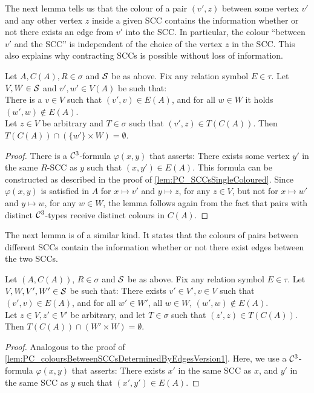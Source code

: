\documentclass[a4paper,UKenglish,cleveref, autoref, thm-restate]{lipics-v2021}
\renewcommand{\phi}{\varphi}
\renewcommand{\phi}{\varphi}
\newcommand{\Cc}{{\cal C}}
\newcommand{\Ss}{{\cal S}}
\begin{document}
	The next lemma tells us that the colour of a pair $(v',z)$ between some vertex $v'$ and any other vertex $z$ inside a given SCC contains the information whether or not there exists an edge from $v'$ into the SCC. In particular, the colour ``between $v'$ and the SCC'' is independent of the choice of the vertex $z$ in the SCC.
	This also explains why contracting SCCs is possible without loss of information.
	
	\begin{lemma}
		\label{lem:PC_coloursBetweenSCCsDeterminedByEdgesVersion1}
		Let $A,C(A), R \in \sigma$ and $\Ss$ be as above. Fix any relation symbol $E \in \tau$. Let $V,W \in \Ss$ and $v',w' \in V(A)$ be such that:\\
		There is a $v \in V$ such that $(v',v) \in E(A)$, and for all $w \in W$ it holds $(w',w) \notin E(A)$. \\
		Let $z \in V$ be arbitrary and $T \in \sigma$ such that $(v',z) \in T(C(A))$. Then $T(C(A)) \cap (\{w'\} \times W) = \emptyset$.
	\end{lemma}
	\begin{proof}
		There is a $\Cc^3$-formula $\phi(x,y)$ that asserts: There exists some vertex $y'$ in the same $R$-SCC as $y$ such that $(x,y') \in E(A)$. This formula can be constructed as described in the proof of \autoref{lem:PC_SCCsSingleColoured}. Since $\phi(x,y)$ is satisfied in $A$ for $x \mapsto v'$ and $y \mapsto z$, for any $z \in V$, but not for $x \mapsto w'$ and $y \mapsto w$, for any $w \in W$, the lemma follows again from the fact that pairs with distinct $\Cc^3$-types receive distinct colours in $C(A)$.
	\end{proof}
	
	
	
	
	The next lemma is of a similar kind. It states that the colours of pairs between different SCCs contain the information whether or not there exist edges between the two SCCs.
	
	
	\begin{lemma}
		\label{lem:PC_coloursBetweenSCCsDeterminedByEdges}
		Let $(A,C(A))$, $R \in \sigma$ and $\Ss$ be as above. Fix any relation symbol $E \in \tau$. Let $V,W,V',W' \in \Ss$ be such that: There exists $v' \in V', v \in V$ such that $(v',v) \in E(A)$, and for all $w' \in W'$, all $w \in W$, $(w',w) \notin E(A)$.\\
		Let $z \in V, z' \in V'$ be arbitrary, and let $T \in \sigma$ such that $(z',z) \in T(C(A))$. Then $T(C(A)) \cap (W' \times W) = \emptyset$.
	\end{lemma}
	\begin{proof}
		Analogous to the proof of \autoref{lem:PC_coloursBetweenSCCsDeterminedByEdgesVersion1}. Here, we use a $\Cc^3$-formula $\phi(x,y)$ that asserts: There exists $x'$ in the same SCC as $x$, and $y'$ in the same SCC as $y$ such that $(x',y') \in E(A)$.
	\end{proof}
	
\end{document}
